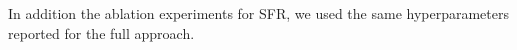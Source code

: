 \documentclass{article}
\newcommand{\mathbold}[1]{\bm{#1}}
\newcommand{\mbf}[1]{\mathbf{#1}}
\newcommand{\MB}{\mbf{B}}
\newcommand{\MZ}{\mbf{Z}}
\newcommand{\T}{\top}
\newcommand{\vbeta}[0]{\mathbold{\beta}}
\newcommand{\vu}{\mbf{u}}
\newcommand{\vw}{\mbf{w}}
\newcommand{\MKzz}{\mbf{K}_{\mbf{z}\mbf{z}}}
\begin{document}
In addition the ablation experiments for SFR, we used the same hyperparameters reported for the full approach.

%







%    


%
\end{document}
